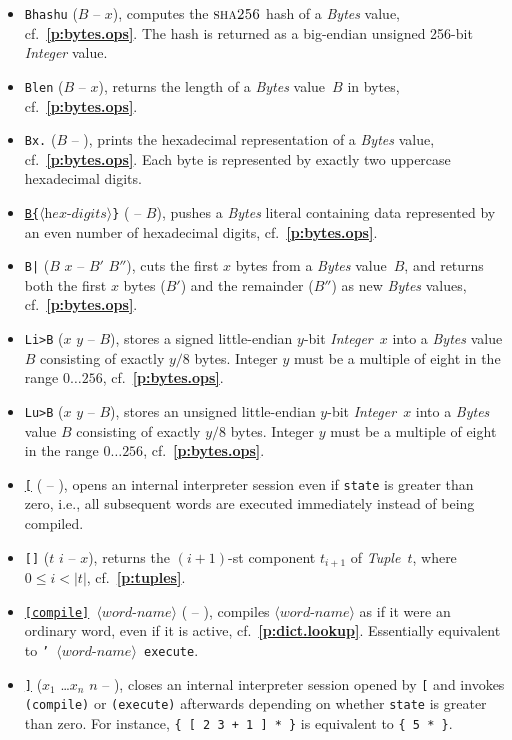 \documentclass[12pt,oneside]{article}
\def\refpoint#1{{\rm\textbf{\ref{#1}}}}
\let\ptref=\refpoint
\def\opsc#1{\operatorname{\textsc{#1}}}
\def\Sha{\opsc{sha256}}
\begin{document}
\begin{itemize}
\item {\tt Bhashu} ($B$ -- $x$), computes the $\Sha$ hash of a {\em Bytes\/} value, cf.~\ptref{p:bytes.ops}. The hash is returned as a big-endian unsigned 256-bit {\em Integer\/} value.
\item {\tt Blen} ($B$ -- $x$), returns the length of a {\em Bytes\/} value~$B$ in bytes, cf.~\ptref{p:bytes.ops}.
\item {\tt Bx.} ($B$ -- ), prints the hexadecimal representation of a {\em Bytes\/} value, cf.~\ptref{p:bytes.ops}. Each byte is represented by exactly two uppercase hexadecimal digits.
\item {\tt \underline{B\{}$\langle{\textit{hex-digits}}\rangle$\}} ( -- $B$), pushes a {\em Bytes\/} literal containing data represented by an even number of hexadecimal digits, cf.~\ptref{p:bytes.ops}.
\item {\tt B|} ($B$ $x$ -- $B'$ $B''$), cuts the first $x$ bytes from a {\em Bytes\/} value~$B$, and returns both the first $x$ bytes ($B'$) and the remainder ($B''$) as new {\em Bytes\/} values, cf.~\ptref{p:bytes.ops}.
\item {\tt Li>B} ($x$ $y$ -- $B$), stores a signed little-endian $y$-bit {\em Integer\/}~$x$ into a {\em Bytes\/} value $B$ consisting of exactly $y/8$ bytes. Integer $y$ must be a multiple of eight in the range $0\ldots256$, cf.~\ptref{p:bytes.ops}.
\item {\tt Lu>B} ($x$ $y$ -- $B$), stores an unsigned little-endian $y$-bit {\em Integer\/}~$x$ into a {\em Bytes\/} value $B$ consisting of exactly $y/8$ bytes. Integer $y$ must be a multiple of eight in the range $0\ldots256$, cf.~\ptref{p:bytes.ops}.
\item {\tt \underline{[}} ( -- ), opens an internal interpreter session even if {\tt state} is greater than zero, i.e., all subsequent words are executed immediately instead of being compiled.
\item {\tt []} ($t$ $i$ -- $x$), returns the $(i+1)$-st component $t_{i+1}$ of {\em Tuple\/}~$t$, where $0\leq i<|t|$, cf.~\ptref{p:tuples}.
\item {\tt \underline{[compile]} $\langle\textit{word-name}\rangle$} ( -- ), compiles $\langle\textit{word-name}\rangle$ as if it were an ordinary word, even if it is active, cf.~\ptref{p:dict.lookup}. Essentially equivalent to {\tt ' $\langle\textit{word-name}\rangle$ execute}.
\item {\tt \underline{]}} ($x_1$ \dots $x_n$ $n$ -- ), closes an internal interpreter session opened by {\tt [} and invokes {\tt (compile)} or {\tt (execute)} afterwards depending on whether {\tt state} is greater than zero. For instance, {\tt \{ [ 2 3 + 1 ] * \}} is equivalent to {\tt \{ 5 * \}}.

\end{itemize}
\end{document}

